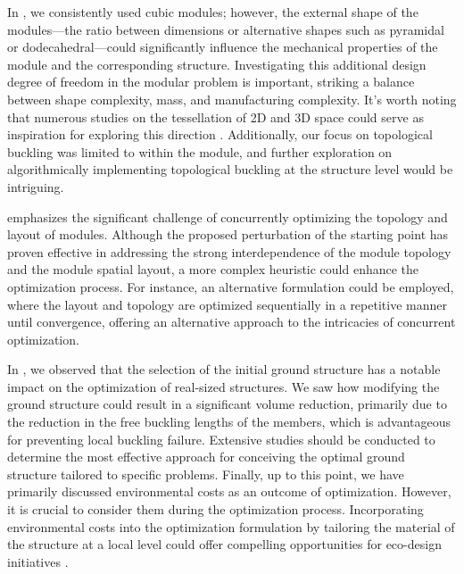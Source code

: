 In , we consistently used cubic modules; however, the external shape of the modules—\ie the ratio between dimensions or alternative shapes such as pyramidal or dodecahedral—could significantly influence the mechanical properties of the module and the corresponding structure. Investigating this additional design degree of freedom in the modular problem is important, striking a balance between shape complexity, mass, and manufacturing complexity. It's worth noting that numerous studies on the tessellation of 2D and 3D space could serve as inspiration for exploring this direction . Additionally, our focus on topological buckling was limited to within the module, and further exploration on algorithmically implementing topological buckling at the structure level would be intriguing.

 emphasizes the significant challenge of concurrently optimizing the topology and layout of modules. Although the proposed perturbation of the starting point has proven effective in addressing the strong interdependence of the module topology and the module spatial layout, a more complex heuristic could enhance the optimization process. For instance, an alternative formulation could be employed, where the layout and topology are optimized sequentially in a repetitive manner until convergence, offering an alternative approach to the intricacies of concurrent optimization.

In , we observed that the selection of the initial ground structure has a notable impact on the optimization of real-sized structures. We saw how modifying the ground structure could result in a significant volume reduction, primarily due to the reduction in the free buckling lengths of the members, which is advantageous for preventing local buckling failure. Extensive studies should be conducted to determine the most effective approach for conceiving the optimal ground structure tailored to specific problems. Finally, up to this point, we have primarily discussed environmental costs as an outcome of optimization. However, it is crucial to consider them during the optimization process. Incorporating environmental costs into the optimization formulation by tailoring the material of the structure at a local level could offer compelling opportunities for eco-design initiatives .